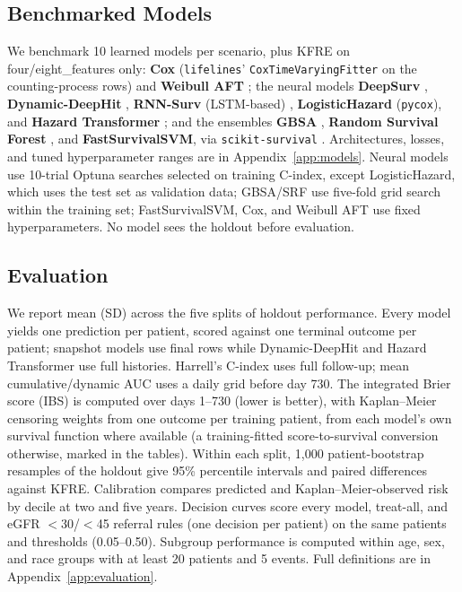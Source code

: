 \subsection{Benchmarked Models} \label{sec:models}
We benchmark 10 learned models per scenario, plus KFRE on four/eight\_features only: \textbf{Cox} (\texttt{lifelines}' \texttt{CoxTimeVaryingFitter} on the counting-process rows) and \textbf{Weibull AFT} \citep{cox1972regression,anderson1991nonproportional_weibull,davidson2019lifelines}; the neural models \textbf{DeepSurv} \citep{katzman2018deepsurv}, \textbf{Dynamic-DeepHit} \citep{lee2020dynamicdeephit,lee2018deephit}, \textbf{RNN-Surv} (LSTM-based) \citep{giunchiglia2018rnn_surv}, \textbf{LogisticHazard} (\texttt{pycox}), and \textbf{Hazard Transformer} \citep{hazard_transformer,vaswani2017attention}; and the ensembles \textbf{GBSA} \citep{chen2013gradient_GBSA}, \textbf{Random Survival Forest} \citep{pickett2021random_survival_forests,ishwaran2008random}, and \textbf{FastSurvivalSVM}, via \texttt{scikit-survival} \citep{polsterl2020sksurv}. Architectures, losses, and tuned hyperparameter ranges are in Appendix~\ref{app:models}. Neural models use 10-trial Optuna searches selected on training C-index, except LogisticHazard, which uses the test set as validation data; GBSA/SRF use five-fold grid search within the training set; FastSurvivalSVM, Cox, and Weibull AFT use fixed hyperparameters. No model sees the holdout before evaluation.

\subsection{Evaluation} \label{sec:eval}
We report mean (SD) across the five splits of holdout performance. Every model yields one prediction per patient, scored against one terminal outcome per patient; snapshot models use final rows while Dynamic-DeepHit and Hazard Transformer use full histories. Harrell's C-index uses full follow-up; mean cumulative/dynamic AUC uses a daily grid before day 730. The integrated Brier score (IBS) is computed over days 1--730 (lower is better), with Kaplan--Meier censoring weights from one outcome per training patient, from each model's own survival function where available (a training-fitted score-to-survival conversion otherwise, marked in the tables). Within each split, 1{,}000 patient-bootstrap resamples of the holdout give 95\% percentile intervals and paired differences against KFRE. Calibration compares predicted and Kaplan--Meier-observed risk by decile at two and five years. Decision curves \citep{vickers2006decisioncurve} score every model, treat-all, and eGFR $<$30/$<$45 referral rules (one decision per patient) on the same patients and thresholds (0.05--0.50). Subgroup performance is computed within age, sex, and race groups with at least 20 patients and 5 events. Full definitions are in Appendix~\ref{app:evaluation}.
